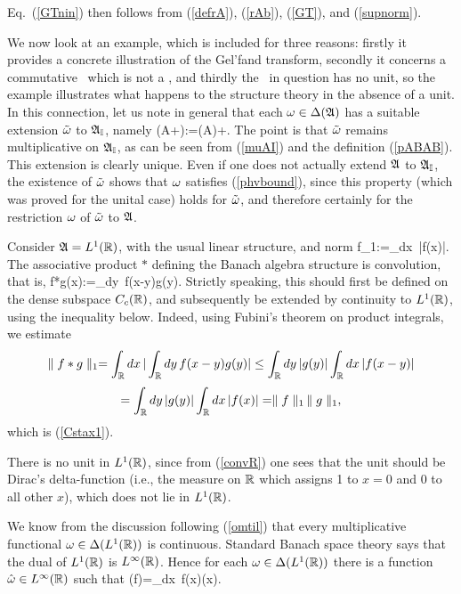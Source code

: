 Eq.\ (\ref{GTnin}) then follows from (\ref{defrA}), (\ref{rAb}),
(\ref{GT}), and (\ref{supnorm}).\enp

We now look at an example, which is included for three reasons:
firstly it provides a concrete illustration of the Gel'fand transform,
secondly it concerns a commutative \BA\ which is not a \ca, and
thirdly the \BA\ in question has no unit, so the example illustrates
what happens to the structure theory in the absence of a unit. In this
connection, let us note in general that each $\omega\in\Delta({\frak A})$ has a
suitable extension $\tilde{\omega}$ to ${\frak A}_{\Bbb I}$, namely \be
\om(A+\lm\I):=\om(A)+\lm.  \ee The point is that $\tilde{\omega}$
remains multiplicative on ${\frak A}_{\Bbb I}$, as can be seen from (\ref{muAI}) and
the definition (\ref{pABAB}). This extension is clearly unique. Even
if one does not actually extend ${\frak A}$ to ${\frak A}_{\Bbb I}$, the existence of
$\tilde{\omega}$ shows that $\omega$ satisfies (\ref{phvbound}), since this
property (which was proved for the unital case) holds for $\tilde{\omega}$,
and therefore certainly for the restriction $\omega$ of $\tilde{\omega}$ to
${\frak A}$.

Consider ${\frak A}=L^1({\Bbb R})$, with the usual linear structure, and norm \be
\n f\n_1:=\int_{\R}dx\, |f(x)|.  \ee The associative product $*$
defining the Banach algebra structure is convolution, that is, \be
f*g(x):=\int_{\R}dy\, f(x-y)g(y).  \ee Strictly speaking,
this should first be defined on the dense subspace $C_c({\Bbb R})$, and
subsequently be extended by continuity to $L^1({\Bbb R})$, using the
inequality below. Indeed, using Fubini's theorem on product integrals,
we estimate
$$
\parallel f*g\parallel_1=\int_{{\Bbb R}}dx\,|\int_{{\Bbb R}}dy\, f(x-y)g(y)|\leq \int_{{\Bbb R}}dy\,
|g(y)| \int_{{\Bbb R}}dx\,|f(x-y)|$$
$$
=\int_{{\Bbb R}}dy\, |g(y)| \int_{{\Bbb R}}dx\,|f(x)|=\parallel f\parallel_1\,\parallel g\parallel_1,$$ which
is (\ref{Cstax1}).

 There is no unit in $L^1({\Bbb R})$, since from (\ref{convR}) one sees that
the unit should be Dirac's delta-function (i.e., the measure on ${\Bbb R}$
which assigns 1 to $x=0$ and 0 to all other $x$), which does not lie
in $L^1({\Bbb R})$.

We know from the discussion following (\ref{omtil}) that every
multiplicative functional $\omega\in\Delta(L^1({\Bbb R}))$ is continuous. Standard
Banach space theory says that the dual of $L^1({\Bbb R})$ is
$L^{\infty}({\Bbb R})$. Hence for each $\omega\in\Delta(L^1({\Bbb R}))$ there is a
function $\hat{\omega}\in L^{\infty}({\Bbb R})$ such that \be
\om(f)=\int_{\R}dx\, f(x)\hat{\om}(x).  \ee

